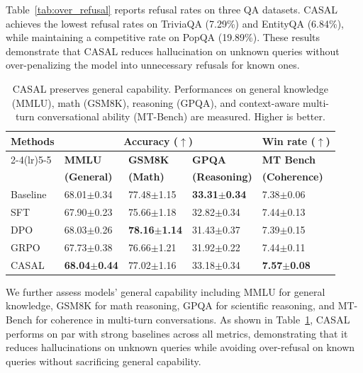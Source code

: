 Table~\ref{tab:over_refusal} reports refusal rates on three QA datasets. CASAL achieves the lowest refusal rates on TriviaQA (7.29\%) and EntityQA (6.84\%), while maintaining a competitive rate on PopQA (19.89\%). These results demonstrate that CASAL reduces hallucination on unknown queries without over-penalizing the model into unnecessary refusals for known ones.

\begin{table}[htbp]
\centering
\small
\begin{tabularx}{\linewidth}{l *{3}{X} X}
\toprule
\textbf{Methods} &
\multicolumn{3}{c}{\textbf{Accuracy ($\uparrow$)}} &
\multicolumn{1}{c}{\textbf{Win rate ($\uparrow$)}} \\
\cmidrule(lr){2-4}\cmidrule(lr){5-5}
& \textbf{MMLU} & \textbf{GSM8K} & \textbf{GPQA} & \textbf{MT Bench} \\
& \textbf{(General)} & \textbf{(Math)} & \textbf{(Reasoning)} & \textbf{(Coherence)} \\
\midrule
Baseline & 68.01$\pm$0.34 & 77.48$\pm$1.15 & \textbf{33.31$\pm$0.34} & 7.38$\pm$0.06 \\
\midrule\midrule
SFT      & 67.90$\pm$0.23 & 75.66$\pm$1.18 & 32.82$\pm$0.34 & 7.44$\pm$0.13 \\
DPO      & 68.03$\pm$0.26 & \textbf{78.16$\pm$1.14} & 31.43$\pm$0.37 & 7.39$\pm$0.15 \\
GRPO     & 67.73$\pm$0.38 & 76.66$\pm$1.21 & 31.92$\pm$0.22 & 7.44$\pm$0.11 \\
CASAL    & \textbf{68.04$\pm$0.44} & 77.02$\pm$1.16 & 33.18$\pm$0.34 & \textbf{7.57$\pm$0.08} \\
\bottomrule
\end{tabularx}
\caption[CASAL preserves general capability]{CASAL preserves general capability. Performances on general knowledge (MMLU), math (GSM8K), reasoning (GPQA), and context-aware multi-turn conversational ability (MT-Bench) are measured. Higher is better.}
\label{tab:general_capability}
\end{table}

We further assess models' general capability including MMLU \citep{mmlu} for general knowledge, GSM8K \citep{gsm8k} for math reasoning, GPQA \citep{gpqa} for scientific reasoning, and MT-Bench \citep{mtbench} for coherence in multi-turn conversations. As shown in Table~\ref{tab:general_capability}, CASAL performs on par with strong baselines across all metrics, demonstrating that it reduces hallucinations on unknown queries while avoiding over-refusal on known queries without sacrificing general capability.

